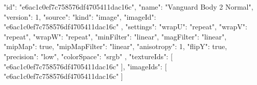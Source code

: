 {
  "id": "e6ac1c0ef7c758576df4705411dac16c",
  "name": "Vanguard Body 2 Normal",
  "version": 1,
  "source": {
    "kind": "image",
    "imageId": "e6ac1c0ef7c758576df4705411dac16c"
  },
  "settings": {
    "wrapU": "repeat",
    "wrapV": "repeat",
    "wrapW": "repeat",
    "minFilter": "linear",
    "magFilter": "linear",
    "mipMap": true,
    "mipMapFilter": "linear",
    "anisotropy": 1,
    "flipY": true,
    "precision": "low",
    "colorSpace": "srgb"
  },
  "textureIds": [
    "e6ac1c0ef7c758576df4705411dac16c"
  ],
  "imageIds": [
    "e6ac1c0ef7c758576df4705411dac16c"
  ]
}

